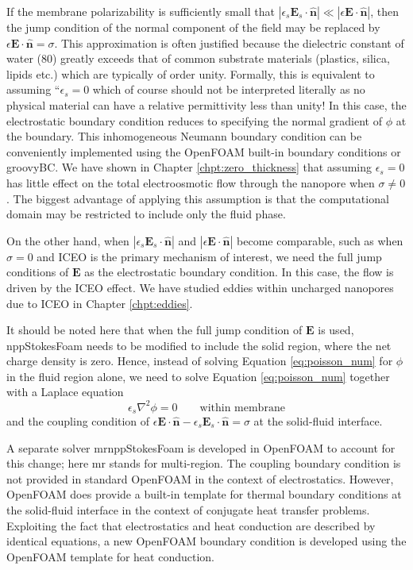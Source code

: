 If the membrane polarizability is sufficiently small that $|\epsilon_{s} \mathbf{E}_{s} \cdot \hat{\mathbf{n}}|\ll|\epsilon \mathbf{E} \cdot  \hat{\mathbf{n}}|$, then the jump condition of the normal component of the field may be replaced by $\epsilon \mathbf{E} \cdot \hat{\mathbf{n}} = \sigma$. This approximation is often justified because the dielectric constant of water ($80$) greatly exceeds that of common substrate materials (plastics, silica, lipids etc.) which are typically of order unity. Formally, this is equivalent to assuming ``$\epsilon_s = 0$ which of course should not be interpreted literally as no physical material can have a relative permittivity less than unity! In this case, the electrostatic boundary condition reduces to specifying the normal gradient of $\phi$ at the boundary. This inhomogeneous Neumann boundary condition can be conveniently implemented using the OpenFOAM built-in boundary conditions or \textsf{groovyBC}. We have shown in Chapter \ref{chpt:zero_thickness} that assuming $\epsilon_s=0$ has little effect on the total electroosmotic flow through the nanopore when $\sigma \neq 0$. The biggest advantage of applying this assumption is that the computational domain may be restricted to include only the fluid phase.

On the other hand, when $|\epsilon_{s} \mathbf{E}_{s} \cdot \hat{\mathbf{n}}|$ and 
$|\epsilon \mathbf{E} \cdot  \hat{\mathbf{n}}|$ become comparable, such as when $\sigma = 0$ and ICEO is the primary mechanism of interest, we need the full jump conditions of $\mathbf{E}$ as the electrostatic boundary condition. In this case, the flow is driven by the ICEO effect. We have studied eddies within uncharged nanopores due to ICEO in Chapter \ref{chpt:eddies}. 

It should be noted here that when the full jump condition of $\mathbf{E}$ is used, \textsf{nppStokesFoam} needs to be modified to include the solid region, where the net charge density is zero. Hence, instead of solving Equation \ref{eq:poisson_num} for $\phi$ in the fluid region alone, we need to solve Equation \ref{eq:poisson_num} together with a Laplace equation
\begin{equation}
\epsilon_s \nabla^2 \phi = 0 \qquad \mbox{within membrane}
\label{eq:laplace_num}
\end{equation}
and the coupling condition of $\epsilon \mathbf{E} \cdot  \hat{\mathbf{n}} - \epsilon_{s} \mathbf{E}_{s} \cdot \hat{\mathbf{n}} = \sigma$ at the solid-fluid interface. 

A separate solver \textsf{mrnppStokesFoam} is developed in OpenFOAM to account for this change; here \textsf{mr} stands for multi-region. The coupling boundary condition is not provided in standard OpenFOAM in the context of electrostatics. However, OpenFOAM does provide a built-in template for thermal boundary conditions at the solid-fluid interface in the context of conjugate heat transfer problems. Exploiting the fact that electrostatics and heat conduction are described by identical equations, a new OpenFOAM boundary condition is developed using the OpenFOAM template for heat conduction.

